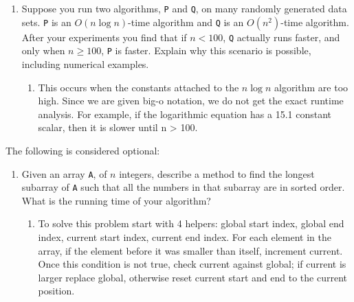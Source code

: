 \documentclass[11pt]{article}
\begin{document}
\begin{enumerate}[leftmargin=*]
        \item Suppose you run two algorithms, \verb|P| and \verb|Q|, on many randomly generated data sets.  \verb|P| is an $O(n \log n)$-time algorithm and \verb|Q| is an $O(n^2)$-time algorithm.  After your experiments you find that if $n<100$, \verb|Q| actually runs faster, and only when $n\ge 100$, \verb|P| is faster.  Explain why this scenario is possible, including numerical examples.
        \begin{enumerate}
            \item This occurs when the constants attached to the $n \log n$ algorithm are too high. Since we are given big-o notation, we do not get the exact runtime analysis. For example, if the logarithmic equation has a 15.1 constant scalar, then it is slower until n > 100. 
        \end{enumerate}
    
    \end{enumerate}
    
    The following is considered optional:
    \begin{enumerate}
        
        \item Given an array \verb|A|, of $n$ integers, describe a method to find the longest subarray of \verb|A| such that all the numbers in that subarray are in sorted order.  What is the running time of your algorithm?
        \begin{enumerate}
            \item To solve this problem start with 4 helpers: global start index, global end index, current start index, current end index. For each element in the array, if the element before it was smaller than itself, increment current. Once this condition is not true, check current against global; if current is larger replace global, otherwise reset current start and end to the current position.
        \end{enumerate}
    
    \end{enumerate}
    
    \label{r:lastpage}
    
    
\end{document}
